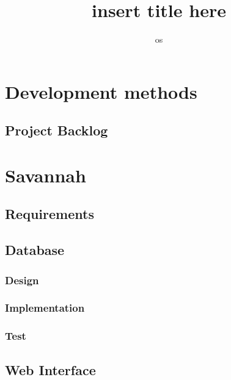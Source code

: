 

\title{insert title here} %
\author{os} %


\maketitle
\tableofcontents
	
	
		
\chapter{Development methods}
%	
    
  \section{Project Backlog}
    \label{sect:pback}
    

\chapter{Savannah} %
  \section{Requirements} %
  \section{Database}
  	
    \subsection{Design}
    	
    \subsection{Implementation}
    	
    \subsection{Test}

  \section{Web Interface}
   \label{sect:webInterface}
